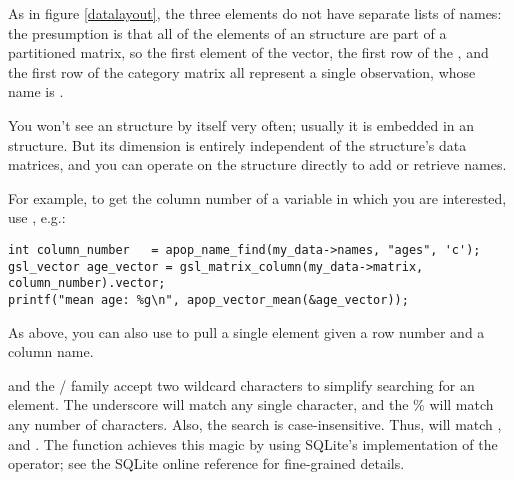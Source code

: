 As in figure \ref{datalayout}, the three elements do not have separate lists of names: the presumption
is that all of the elements of an  structure are part
of a partitioned matrix, so the first element of the vector, the first
row of the , and the first row of the category matrix all represent a single observation, whose name is .

You won't see an  structure by itself very often;
usually it is embedded in an  structure. But its
dimension is entirely independent of the  structure's
data matrices, and you can operate on the  structure
directly to add or retrieve names.

For example, to get the
column number of a variable in which you are interested, use , e.g.:
\begin{lstlisting}
int column_number   = apop_name_find(my_data->names, "ages", 'c');
gsl_vector age_vector = gsl_matrix_column(my_data->matrix, column_number).vector;
printf("mean age: %g\n", apop_vector_mean(&age_vector));
\end{lstlisting}
As above, you can also use  to pull a single
element given a row number and a column name.

 and the / family accept two wildcard characters to simplify
searching for an element. The underscore will match any single
character, and the \% will match any number of characters. Also, the
search is case-insensitive. Thus,  will match
,  and . The function
achieves this magic by using SQLite's implementation of the 
operator; see the SQLite online reference for fine-grained details.


